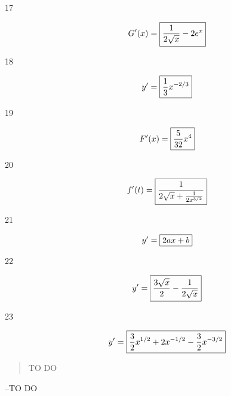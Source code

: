 \documentclass[letterpaper]{exam}
\begin{document}
\begin{description}
    \item[17] 
      \[
        G'(x) = \boxed{ \frac{1}{2 \sqrt{x}}-2 e^x } \\
      \]

    \item[18] 
      \[
        y' = \boxed{ \frac{1}{3} x^{-2/3} } \\
      \]

    \item[19] 
      \[
        F'(x) = \boxed{ \frac{5}{32} x^4 } \\
      \]

    \item[20] 
      \[
        f'(t) = \boxed{ \frac{1}{2 \sqrt{x} + \frac{1}{2 x^{3/2}} } } \\
      \]

    \item[21] 
      \[
        y' = \boxed{ 2ax + b } \\
      \]

    \item[22] 
      \[
        y' = \boxed{ \frac{3 \sqrt{x}}{2}-\frac{1}{2 \sqrt{x}} } \\
      \]

    \item[23] 
      \[
        y' = \boxed{ \frac{3}{2}x^{1/2} + 2x^{-1/2} - \frac{3}{2} x^{-3/2} } \\
      \]

   \end{description}
 
  \else
    \vspace{10 cm}
    \begin{quote}
      \begin{em}
        TO DO
      \end{em}
    \end{quote}
    \hspace{2 cm} --TO DO
  \fi
\end{document}
